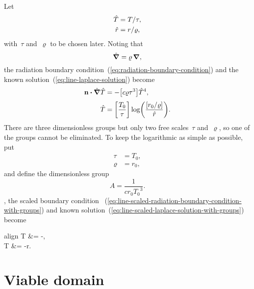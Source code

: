 Let
\begin{align}
  \hat{T} &= T / \tau, \label{eq:line-scaled-temperature} \\
  \hat{r} &= r / \varrho, \label{eq:line-scaled-r}
\end{align}
with~$\tau$ and~$\varrho$ to be chosen later.
Noting that
\begin{equation}
  \mathop{}\!\hat{\mathop{}\!\boldsymbol{\mathrm{\nabla}}} = \varrho \mathop{}\!\boldsymbol{\mathrm{\nabla}},
  \label{eq:line-scaled-del}
\end{equation}
the radiation boundary condition~(\ref{eq:radiation-boundary-condition})
and the known solution~(\ref{eq:line-laplace-solution})
become
\begin{align}
  \normalvec \dotp \scaleddel \scaled{T}
    &= -\squarebr*{c \varrho \tau^3} \scaled{T}^4,
    \label{eq:line-scaled-radiation-boundary-condition-with-groups}
    \\[\fraclinespace]
  \scaled{T}
    &=
      \squarebr*{\frac{T_0}{\tau}}
      \log \roundbr*{\frac{\squarebr{r_0 / \varrho}}{\scaled{r}}}.
    \label{eq:line-scaled-laplace-solution-with-groups}
\end{align}
There are three dimensionless groups
but only two free scales~$\tau$ and~$\varrho$,
so one of the groups cannot be eliminated.
To keep the logarithmic as simple as possible,
put
\begin{align}
  \tau &= T_0,
    \label{eq:line-temperature-scale} \\
  \varrho &= r_0,
    \label{eq:line-length-scale}
\end{align}
and define the dimensionless group
\begin{equation}
  A = \frac{1}{c r_0 {T_0}^3}.
  \label{eq:line-dimensionless-group}
\end{equation}
, the scaled boundary condition~%
  (\ref{eq:line-scaled-radiation-boundary-condition-with-groups})
and known solution~(\ref{eq:line-scaled-laplace-solution-with-groups})
become
\begin{important}{align}
  \normalvec \dotp \del T &= -,
    \label{eq:line-scaled-radiation-boundary-condition} \\[\fraclinespace]
  T &= -\log r.
    \label{eq:line-scaled-laplace-solution}
\end{important}

\section{Viable domain}
\label{sec:polar.viable}


